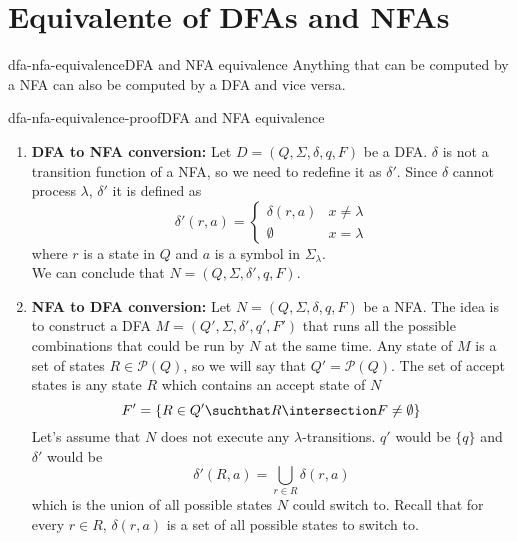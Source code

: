 \documentclass[preview]{standalone}
\newcommand{\emptyString}{\lambda}
\begin{document}
\genpage


\section{Equivalente of DFAs and NFAs}

\begin{snippettheorem}{dfa-nfa-equivalence}{DFA and NFA equivalence}
    Anything that can be computed by a NFA can also be computed by a DFA and vice versa.
\end{snippettheorem}

\begin{snippetproof}{dfa-nfa-equivalence-proof}{DFA and NFA equivalence}
    \begin{enumerate}
        \item \textbf{DFA to NFA conversion:}
        Let \(D=(Q, \Sigma, \delta, q, F)\) be a DFA.
        \(\delta\) is not a transition function of a NFA, so we need to redefine it as \(\delta'\).
        Since \(\delta\) cannot process \(\emptyString\), \(\delta'\)
        it is defined as
        \[
            \delta'(r, a)=
            \begin{cases} 
                \delta(r, a) & x \neq \emptyString \\
                \emptyset & x = \emptyString
            \end{cases}
        \]
        where \(r\) is a state in \(Q\) and \(a\) is a symbol in \(\Sigma_\emptyString\). \\
        We can conclude that \(N=(Q, \Sigma, \delta', q, F)\).
        \item \textbf{NFA to DFA conversion:}
        Let \(N=(Q, \Sigma, \delta, q, F)\) be a NFA. The idea is to construct a DFA \(M=(Q', \Sigma, \delta', q', F')\)
        that runs all the possible combinations that could be run by \(N\) at the same time.
        Any state of \(M\) is a set of states \(R \in \mathcal{P}(Q)\), so we will say that
        \(Q'=\mathcal{P}(Q)\). The set of accept states is any state \(R\) which contains an accept
        state of \(N\)
        \[
            F' = \{R \in Q' \suchthat R \intersection F \neq \emptyset\}
        \]
        Let's assume that \(N\) does not execute any \(\emptyString\)-transitions.
        \(q'\) would be \(\{q\}\) and \(\delta'\) would be
        \[
            \delta'(R, a) = \bigcup_{r\in R}\delta(r,a)
        \]
        which is the union of all possible states \(N\) could switch to.
        Recall that for every \(r\in R\), \(\delta(r,a)\) is a set
        of all possible states to switch to.
        

\end{enumerate}
\end{snippetproof}
\end{document}
